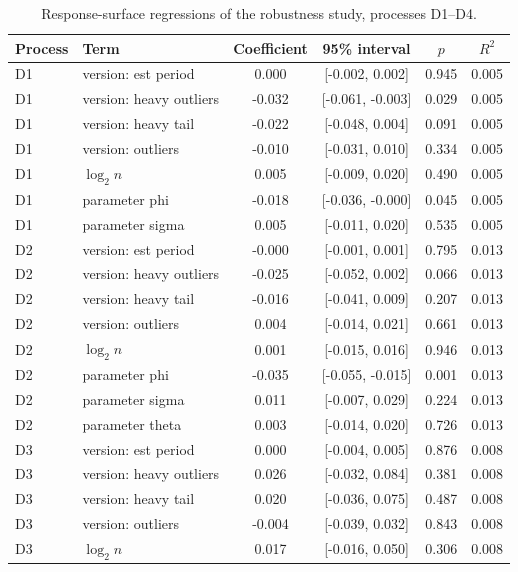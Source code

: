 \begin{table}[!htbp]
\centering
\begin{threeparttable}
\caption{Response-surface regressions of the robustness study, processes D1--D4.}
\label{tab:si-response}
\scriptsize
\begin{tabular}{llcccc}
\toprule
Process & Term & Coefficient & 95\% interval & $p$ & $R^2$ \\
\midrule
D1 & version: est period & 0.000 & [-0.002, 0.002] & 0.945 & 0.005 \\
D1 & version: heavy outliers & -0.032 & [-0.061, -0.003] & 0.029 & 0.005 \\
D1 & version: heavy tail & -0.022 & [-0.048, 0.004] & 0.091 & 0.005 \\
D1 & version: outliers & -0.010 & [-0.031, 0.010] & 0.334 & 0.005 \\
D1 & $\log_2 n$ & 0.005 & [-0.009, 0.020] & 0.490 & 0.005 \\
D1 & parameter phi & -0.018 & [-0.036, -0.000] & 0.045 & 0.005 \\
D1 & parameter sigma & 0.005 & [-0.011, 0.020] & 0.535 & 0.005 \\
D2 & version: est period & -0.000 & [-0.001, 0.001] & 0.795 & 0.013 \\
D2 & version: heavy outliers & -0.025 & [-0.052, 0.002] & 0.066 & 0.013 \\
D2 & version: heavy tail & -0.016 & [-0.041, 0.009] & 0.207 & 0.013 \\
D2 & version: outliers & 0.004 & [-0.014, 0.021] & 0.661 & 0.013 \\
D2 & $\log_2 n$ & 0.001 & [-0.015, 0.016] & 0.946 & 0.013 \\
D2 & parameter phi & -0.035 & [-0.055, -0.015] & 0.001 & 0.013 \\
D2 & parameter sigma & 0.011 & [-0.007, 0.029] & 0.224 & 0.013 \\
D2 & parameter theta & 0.003 & [-0.014, 0.020] & 0.726 & 0.013 \\
D3 & version: est period & 0.000 & [-0.004, 0.005] & 0.876 & 0.008 \\
D3 & version: heavy outliers & 0.026 & [-0.032, 0.084] & 0.381 & 0.008 \\
D3 & version: heavy tail & 0.020 & [-0.036, 0.075] & 0.487 & 0.008 \\
D3 & version: outliers & -0.004 & [-0.039, 0.032] & 0.843 & 0.008 \\
D3 & $\log_2 n$ & 0.017 & [-0.016, 0.050] & 0.306 & 0.008 \\

\end{tabular}
\end{threeparttable}
\end{table}
